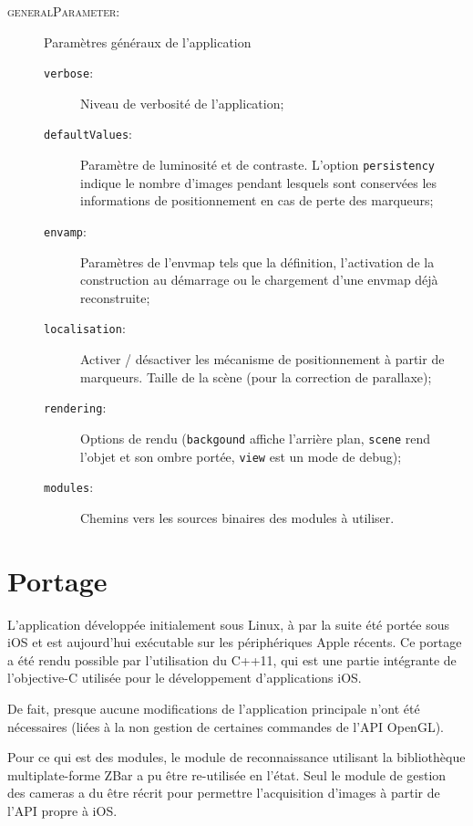 \documentclass[10pt,a4paper,twoside, twocolumn]{report}
\begin{document}
\begin{description}
	\item[\textsc{generalParameter}:]		Paramètres généraux de l'application
		\begin{description}
			\item[\texttt{verbose}:]				Niveau de verbosité de l'application;
			\item[\texttt{defaultValues}:]	Paramètre de luminosité et de contraste. L’option \texttt{persistency} indique le nombre d'images pendant lesquels sont conservées les informations de positionnement en cas de perte des marqueurs;
			\item[\texttt{envamp}:]					Paramètres de l'envmap tels que la définition, l'activation de la construction au démarrage ou le chargement d'une envmap déjà reconstruite;
			\item[\texttt{localisation}:]		Activer / désactiver les mécanisme de positionnement à partir de marqueurs. Taille de la scène (pour la correction de parallaxe);
			\item[\texttt{rendering}:]			Options de rendu (\texttt{backgound} affiche l’arrière plan, \texttt{scene} rend l'objet et son ombre portée, \texttt{view} est un mode de debug);
			\item[\texttt{modules}:]				Chemins vers les sources binaires des modules à utiliser.
		\end{description}
		
\end{description}




\section{Portage}

L'application développée initialement sous Linux, à par la suite été portée sous iOS et est aujourd'hui exécutable sur les périphériques Apple récents. Ce portage a été rendu possible par l'utilisation du C++11, qui est une partie intégrante de l'objective-C utilisée pour le développement d'applications iOS.

De fait, presque aucune modifications de l'application principale n'ont été nécessaires (liées à la non gestion de certaines commandes de l'API OpenGL).

Pour ce qui est des modules, le module de reconnaissance utilisant la bibliothèque multiplate-forme ZBar a pu être re-utilisée en l'état. Seul le module de gestion des cameras a du être récrit pour permettre l’acquisition d'images à partir de l'API propre à iOS.
\end{document}
